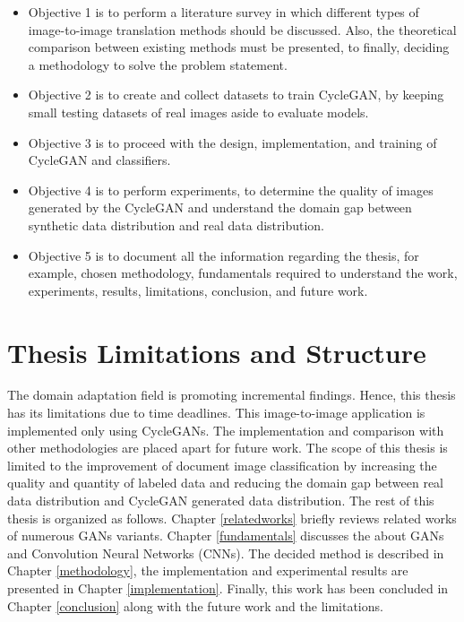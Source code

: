 \begin{itemize}
  \item Objective 1 is to perform a literature survey in which different types of image-to-image translation methods should be discussed. Also, the theoretical comparison between existing methods must be presented, to finally, deciding a methodology to solve the problem statement.
 
  \item Objective 2 is to create and collect datasets to train \ac{CycleGAN}, by keeping small testing datasets of real images aside to evaluate models.
 
  \item Objective 3 is to proceed with the design, implementation, and training of \ac{CycleGAN} and classifiers.
  
  \item Objective 4 is to perform experiments, to determine the quality of images generated by the \ac{CycleGAN} and understand the domain gap between synthetic data distribution and real data distribution.
  
  \item Objective 5 is to document all the information regarding the thesis, for example, chosen methodology, fundamentals required to understand the work, experiments, results, limitations, conclusion, and future work.
    
\end{itemize}


\section{Thesis Limitations and Structure}\label{thesisstructurelimitations}

The domain adaptation field is promoting incremental findings. Hence, this thesis has its limitations due to time deadlines. This image-to-image application is implemented only using \acp{CycleGAN}. The implementation and comparison with other methodologies are placed apart for future work. The scope of this thesis is limited to the improvement of document image classification by increasing the quality and quantity of labeled data and reducing the domain gap between real data distribution and \ac{CycleGAN} generated data distribution. The rest of this thesis is organized as follows. Chapter \ref{relatedworks} briefly reviews related works of numerous \acp{GAN} variants. Chapter \ref{fundamentals} discusses the about \acp{GAN} and Convolution Neural Networks (CNNs). The decided method is described in Chapter \ref{methodology}, the implementation and experimental results are presented in Chapter \ref{implementation}. Finally, this work has been concluded in Chapter \ref{conclusion} along with the future work and the limitations.



